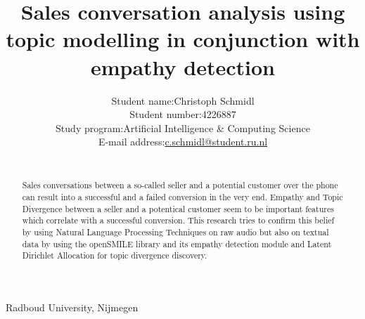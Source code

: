 \documentclass[twoside]{article}
\title{\vspace{-15mm}%
	\fontsize{24pt}{10pt}\selectfont
	\textbf{Sales conversation analysis using topic modelling in conjunction with empathy detection}\\
	}
\author{%
		 \begin{tabular}{rl}
  Student name:& Christoph Schmidl\\ 
  Student number:& 4226887 \\ 
  Study program:& Artificial Intelligence \& Computing Science\\
  E-mail address:& \href{mailto:c.schmidl@student.ru.nl}{c.schmidl@student.ru.nl}\\
 \end{tabular}\\
	}
\date{}
\begin{document}
\maketitle
\thispagestyle{fancy}

  \begin{center}
  	Radboud University, Nijmegen  
  \end{center}  
  \vspace{2.5mm}

\begin{abstract}

\noindent Sales conversations between a so-called seller and a potential customer over the phone can result into a successful and a failed conversion in the very end. Empathy and Topic Divergence between a seller and a potentical customer seem to be important features which correlate with a successful conversion. This research tries to confirm this belief by using Natural Language Processing Techniques on raw audio but also on textual data by using the openSMILE library and its empathy detection module and Latent Dirichlet Allocation for topic divergence discovery.
\end{abstract}
\end{document}
